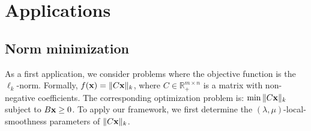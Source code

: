
\section{Applications}	\label{sec:app}
\setcounter{theorem}{5}

%

\subsection{Norm minimization} 	\label{appix-norm}

As a first application, we consider problems where the objective function is the $\ell_{k}$-norm. Formally,  $f(\mathbf{x}) = \|C \mathbf{x}\|_{k}$, where $C \in \mathbb{R}_{+}^{m \times n}$ is a matrix with non-negative coefficients. The corresponding optimization problem is: $\min \|C \mathbf{x}\|_{k}$ subject to $B \mathbf{x} \geq 0$. To apply our framework, we first determine the $(\lambda, \mu)$-local-smoothness parameters of $\|C \mathbf{x}\|_{k}$.

